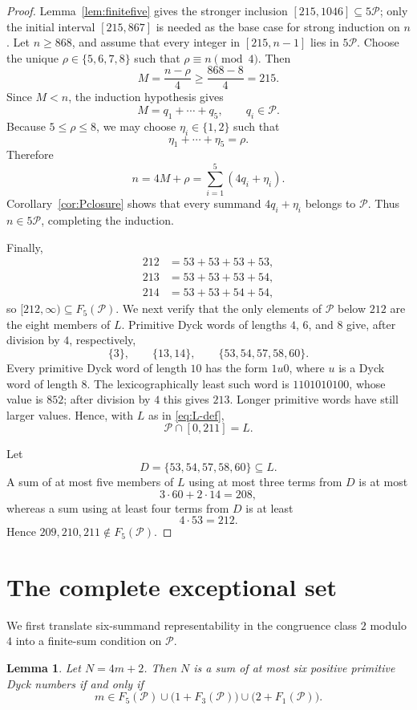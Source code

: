 \documentclass[12pt]{article}
\theoremstyle{plain}
\newtheorem{lemma}[theorem]{Lemma}
\theoremstyle{definition}
\theoremstyle{plain}
\newcommand{\Pset}{\mathcal{P}}
\begin{document}
\begin{proof}
Lemma~\ref{lem:finitefive} gives the stronger inclusion
$[215,1046]\subseteq5\Pset$; only the initial interval $[215,867]$ is
needed as the base case for strong induction on $n$.  Let $n\geq868$, and
assume that every integer in $[215,n-1]$ lies in $5\Pset$.  Choose the
unique $\rho\in\{5,6,7,8\}$ such that
$\rho\equiv n\pmod4$.  Then
\[
 M=\frac{n-\rho}{4}\geq\frac{868-8}{4}=215.
\]
Since $M<n$, the induction hypothesis gives
\[
 M=q_1+\cdots+q_5,\qquad q_i\in\Pset.
\]
Because $5\leq\rho\leq8$, we may choose $\eta_i\in\{1,2\}$ such that
\[
 \eta_1+\cdots+\eta_5=\rho.
\]
Therefore
\[
 n=4M+\rho=\sum_{i=1}^{5}(4q_i+\eta_i).
\]
Corollary~\ref{cor:Pclosure} shows that every summand $4q_i+\eta_i$ belongs
to $\Pset$.  Thus $n\in5\Pset$, completing the induction.

Finally,
\[
\begin{aligned}
212&=53+53+53+53,\\
213&=53+53+53+54,\\
214&=53+53+54+54,
\end{aligned}
\]
so $[212,\infty)\subseteq F_5(\Pset)$.  We next verify that the only elements of $\Pset$ below $212$ are the
eight members of $L$.  Primitive Dyck words of lengths $4$, $6$, and $8$
give, after division by $4$, respectively,
\[
 \{3\},\qquad \{13,14\},\qquad \{53,54,57,58,60\}.
\]
Every primitive Dyck word of length $10$ has the form $1u0$, where $u$
is a Dyck word of length $8$.  The lexicographically least such word is
$1101010100$, whose value is $852$; after division by $4$ this gives
$213$.  Longer primitive words have still larger values.  Hence, with $L$ as
in \eqref{eq:L-def},
\[
 \Pset\cap[0,211]=L.
\]

Let
\[
 D=\{53,54,57,58,60\}\subseteq L.
\]
A sum of at most five members of $L$ using at most three terms from $D$
is at most
\[
 3\cdot60+2\cdot14=208,
\]
whereas a sum using at least four terms from $D$ is at least
\[
 4\cdot53=212.
\]
Hence $209,210,211\notin F_5(\Pset)$.
\end{proof}

\section{The complete exceptional set}\label{sec:exceptions}

We first translate six-summand representability in the congruence class
$2$ modulo $4$ into a finite-sum condition on $\Pset$.

\begin{lemma}\label{lem:sixcriterion}
Let $N=4m+2$.  Then $N$ is a sum of at most six positive primitive Dyck
numbers if and only if
\[
 m\in F_5(\Pset)
 \cup\bigl(1+F_3(\Pset)\bigr)
 \cup\bigl(2+F_1(\Pset)\bigr).
\]
\end{lemma}
\end{document}
